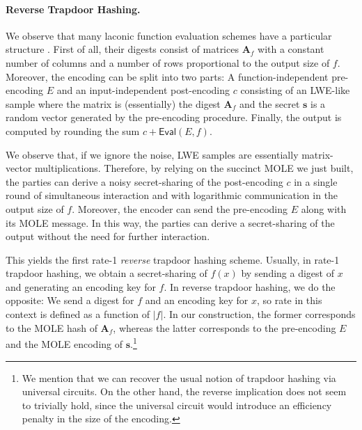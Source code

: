 \documentclass{article}
\newcommand{\algofont}[1]{\ensuremath{\mathsf{#1}}}
\newcommand{\Eval}{\algofont{Eval}\xspace}
\begin{document}
\paragraph{Reverse Trapdoor Hashing.} We observe that many laconic function evaluation schemes have a particular structure \cite{FOCS:QuaWeeWic18,FOCS:HsiLinLuo23,C:DHMWW24,C:Wee24}. First of all, their digests consist of matrices $\mathbf{A}_f$ with a constant number of columns and a number of rows proportional to the output size of $f$. Moreover, the encoding can be split into two parts: A function-independent pre-encoding $E$ and an input-independent post-encoding $c$ consisting of an LWE-like sample where the matrix is (essentially) the digest $\mathbf{A}_f$ and the secret $\mathbf{s}$ is a random vector generated by the pre-encoding procedure. Finally, the output is computed by rounding the sum $c+\Eval(E, f)$. 

We observe that, if we ignore the noise, LWE samples are essentially matrix-vector multiplications. Therefore, by relying on the succinct MOLE we just built, the parties can derive a noisy secret-sharing of the post-encoding $c$ in a single round of simultaneous interaction and with logarithmic communication in the output size of $f$. Moreover, the encoder can send the pre-encoding $E$ along with its MOLE message. In this way, the parties can derive a secret-sharing of the output without the need for further interaction.

This yields the first rate-1 \emph{reverse} trapdoor hashing scheme. Usually, in rate-1 trapdoor hashing, we obtain a secret-sharing of $f(x)$ by sending a digest of $x$ and generating an encoding key for $f$. In reverse trapdoor hashing, we do the opposite: We send a digest for $f$ and an encoding key for $x$, {so rate in this context is defined as a function of $|f|$}. In our construction, the former corresponds to the MOLE hash of $\mathbf{A}_f$, whereas the latter corresponds to the pre-encoding $E$ and the MOLE encoding of $\mathbf{s}$.\footnote{We mention that we can recover the usual notion of trapdoor hashing via universal circuits. On the other hand, the reverse implication does not seem to trivially hold, since the universal circuit would introduce an efficiency penalty in the size of the encoding.}
\end{document}
